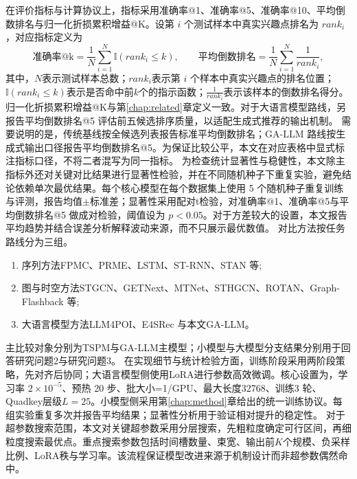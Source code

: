 在评价指标与计算协议上，指标采用准确率@1、准确率@5、准确率@10、平均倒数排名与归一化折损累积增益@K。设第 $i$ 个测试样本中真实兴趣点排名为 $rank_i$，对应指标定义为
\begin{equation}
\text{准确率@k}=\frac{1}{N}\sum_{i=1}^{N}\mathbb{I}(rank_i\le k),\qquad
\text{平均倒数排名}=\frac{1}{N}\sum_{i=1}^{N}\frac{1}{rank_i},
\label{eq:c4-metrics}
\end{equation}
其中，$N$表示测试样本总数；$rank_i$表示第 $i$ 个样本中真实兴趣点的排名位置；$\mathbb{I}(rank_i\le k)$表示是否命中前$k$个的指示函数；$\frac{1}{rank_i}$表示该样本的倒数排名得分。
归一化折损累积增益@K与第\ref{chap:related}章定义一致。对于大语言模型路线，另报告平均倒数排名@5 评估前五候选排序质量，以适配生成式推荐的输出机制。
需要说明的是，传统基线按全候选列表报告标准平均倒数排名；GA-LLM 路线按生成式输出口径报告平均倒数排名@5。为保证比较公平，本文在对应表格中显式标注指标口径，不将二者混写为同一指标。
为检查统计显著性与稳健性，本文除主指标外还对关键对比结果进行显著性检验，并在不同随机种子下重复实验，避免结论依赖单次最优结果。每个核心模型在每个数据集上使用 5 个随机种子重复训练与评测，报告均值$\pm$标准差；显著性采用配对t检验，对准确率@1、准确率@5与平均倒数排名@5 做成对检验，阈值设为 $p<0.05$。对于方差较大的设置，本文报告平均趋势并结合误差分析解释波动来源，而不只展示最优数值。
对比方法按任务路线分为三组。
\begin{enumerate}
    \item {\heiti{}序列方法}FPMC、PRME、LSTM、ST-RNN、STAN 等\cite{FPMC,PRME,LSTM,ST-RNN,STAN};
    \item {\heiti{}图与时空方法}STGCN、GETNext、MTNet、STHGCN、ROTAN、Graph-Flashback 等\cite{GETNext,STHGCN,MTNet,ROTAN,GraphFlashback};
    \item {\heiti{}大语言模型方法}LLM4POI、E4SRec 与本文GA-LLM\cite{LLM4POI,E4SRec}。
\end{enumerate}
\par\indent 主比较对象分别为TSPM与GA-LLM主模型；小模型与大模型分支结果分别用于回答研究问题2与研究问题3。
在实现细节与统计检验方面，训练阶段采用两阶段策略，先对齐后协同；大语言模型侧使用LoRA进行参数高效微调。核心设置为，学习率 $2\times10^{-5}$、预热 20 步、批大小=1/GPU、最大长度32768、训练3 轮、Quadkey层级$L=25$。小模型侧采用第\ref{chap:method}章给出的统一训练协议。每组实验重复多次并报告平均结果；显著性分析用于验证相对提升的稳定性。
对于超参数搜索范围，本文对关键超参数采用分层搜索，先粗粒度确定可行区间，再细粒度搜索最优点。重点搜索参数包括时间槽数量、束宽、输出前$K$个规模、负采样比例、LoRA秩与学习率。该流程保证模型改进来源于机制设计而非超参数偶然命中。
